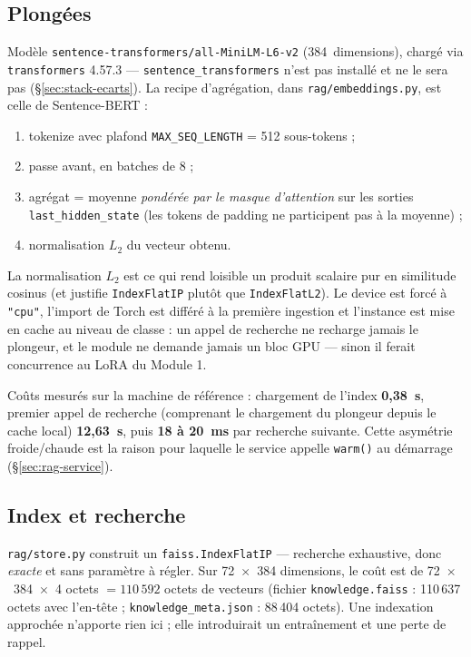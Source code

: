 \subsection{Plongées}
\label{sec:rag-embed}

Modèle \texttt{sentence-transformers/all-MiniLM-L6-v2} (384~dimensions), chargé
via \texttt{transformers} 4.57.3 --- \texttt{sentence\_transformers} n'est pas
installé et ne le sera pas (§\ref{sec:stack-ecarts}). La recipe d'agrégation,
dans \texttt{rag/embeddings.py}, est celle de Sentence-BERT
\cite{reimers2019sbert} :

\begin{enumerate}[label=\arabic*.,leftmargin=*,itemsep=1pt]
  \item tokenize avec plafond \texttt{MAX\_SEQ\_LENGTH} = 512 sous-tokens ;
  \item passe avant, en batches de 8 ;
  \item agrégat = moyenne \emph{pondérée par le masque d'attention} sur les
        sorties \texttt{last\_hidden\_state} (les tokens de padding ne
        participent pas à la moyenne) ;
  \item normalisation $L_2$ du vecteur obtenu.
\end{enumerate}

La normalisation $L_2$ est ce qui rend loisible un produit scalaire pur en
similitude cosinus (et justifie \texttt{IndexFlatIP} plutôt que
\texttt{IndexFlatL2}). Le device est forcé à \texttt{"cpu"}, l'import de Torch
est différé à la première ingestion et l'instance est mise en cache au niveau de
classe : un appel de recherche ne recharge jamais le plongeur, et le module ne
demande jamais un bloc GPU --- sinon il ferait concurrence au LoRA du Module 1.

Coûts mesurés sur la machine de référence : chargement de l'index
\textbf{0,38~s}, premier appel de recherche (comprenant le chargement du
plongeur depuis le cache local) \textbf{12,63~s}, puis \textbf{18 à 20~ms} par
recherche suivante. Cette asymétrie froide/chaude est la raison pour laquelle le
service appelle \texttt{warm()} au démarrage (§\ref{sec:rag-service}).

\subsection{Index et recherche}
\label{sec:rag-index}

\texttt{rag/store.py} construit un \texttt{faiss.IndexFlatIP}
\cite{johnson2019faiss} --- recherche exhaustive, donc \emph{exacte} et sans
paramètre à régler. Sur 72~$\times$~384 dimensions, le coût est de
72~$\times$~384~$\times$~4 octets $=110\,592$ octets de vecteurs (fichier
\texttt{knowledge.faiss} : 110\,637 octets avec l'en-tête ;
\texttt{knowledge\_meta.json} : 88\,404 octets). Une indexation approchée
n'apporte rien ici ; elle introduirait un entraînement et une perte de rappel.


